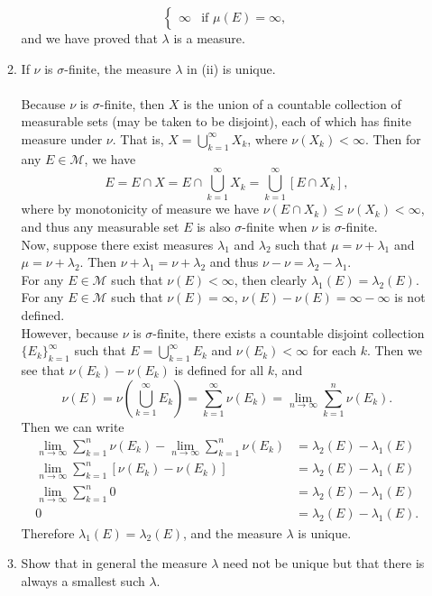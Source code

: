 \begin{enumerate}
\begin{enumerate}[label=(\roman*),align=left]
\[\begin{cases}
			\infty&\text{if }\mu(E)=\infty,
		\end{cases}
		\]
		and we have proved that $\lambda$ is a measure.
		\item If $\nu$ is $\sigma$-finite, the measure $\lambda$ in (ii) is unique.\\
		\\Because $\nu$ is $\sigma$-finite, then $X$ is the union of a countable collection of measurable sets (may be taken to be disjoint), each of which has finite measure under $\nu$.
		That is, $X=\bigcup_{k=1}^\infty X_k$, where $\nu(X_k)<\infty$.
		Then for any $E\in\mathcal{M}$, we have 
		\[
			E=E\cap X = E\cap \bigcup_{k=1}^\infty X_k = \bigcup_{k=1}^\infty[E\cap X_k],
		\]
		where by monotonicity of measure we have $\nu(E\cap X_k)\le\nu(X_k)<\infty$, and thus any measurable set $E$ is also $\sigma$-finite when $\nu$ is $\sigma$-finite.
		\\Now, suppose there exist measures $\lambda_1$ and $\lambda_2$ such that $\mu=\nu+\lambda_1$ and $\mu=\nu+\lambda_2$.
		Then $\nu+\lambda_1=\nu+\lambda_2$ and thus $\nu-\nu=\lambda_2-\lambda_1$.
		\\For any $E\in\mathcal{M}$ such that $\nu(E)<\infty$, then clearly $\lambda_1(E)=\lambda_2(E)$.
		\\For any $E\in\mathcal{M}$ such that $\nu(E)=\infty$, $\nu(E)-\nu(E)=\infty-\infty$ is not defined. 
		\\However, because $\nu$ is $\sigma$-finite, there exists a countable disjoint collection $\{E_k\}_{k=1}^\infty$ such that $E=\bigcup_{k=1}^\infty E_k$ and $\nu(E_k)<\infty$ for each $k$. 
		Then we see that $\nu(E_k)-\nu(E_k)$ is defined for all $k$, and
		\[
			\nu(E)=\nu(\bigcup_{k=1}^\infty E_k)=\sum_{k=1}^\infty \nu(E_k)=\lim_{n\to\infty}\sum_{k=1}^n \nu(E_k).
		\] 
		Then we can write 
		\begin{align*}
			\lim_{n\to\infty}\sum_{k=1}^n \nu(E_k)-\lim_{n\to\infty}\sum_{k=1}^n \nu(E_k)&=\lambda_2(E)-\lambda_1(E)\\
			\lim_{n\to\infty}\sum_{k=1}^n [\nu(E_k)-\nu(E_k)]&=\lambda_2(E)-\lambda_1(E)\\
			\lim_{n\to\infty}\sum_{k=1}^n 0&=\lambda_2(E)-\lambda_1(E)\\
			0&=\lambda_2(E)-\lambda_1(E).
		\end{align*}
		Therefore $\lambda_1(E)=\lambda_2(E)$, and the measure $\lambda$ is unique.
		\item Show that in general the measure $\lambda$ need not be unique but that there is always a smallest such $\lambda$.\\

\end{enumerate}
\end{enumerate}
